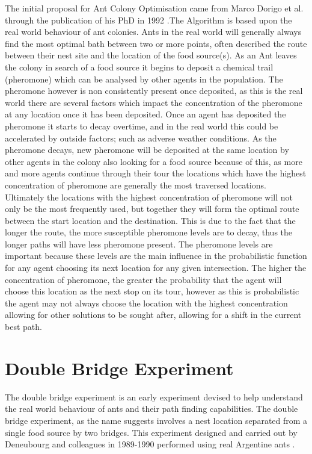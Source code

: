 The initial proposal for Ant Colony Optimisation came from Marco Dorigo et al. through the publication of his PhD in 1992 \cite{Dor1992:thesis}.The Algorithm is based upon the real world behaviour of ant colonies. Ants in the real world will generally always find the most optimal bath between two or more points, often described the route between their nest site and the location of the food source(s). As an Ant leaves the colony in search of a food source it begins to deposit a chemical trail (pheromone) which can be analysed by other agents in the population. The pheromone however is non consistently present once deposited, as this is the real world there are several factors which impact the concentration of the pheromone at any location once it has been deposited. Once an agent has deposited the pheromone it starts to decay overtime, and in the real world this could be accelerated by outside factors; such as adverse weather conditions. As the pheromone decays, new pheromone will be deposited at the same location by other agents in the colony also looking for a food source because of this, as more and more agents continue through their tour the locations which have the highest concentration of pheromone are generally the most traversed locations. Ultimately the locations with the highest concentration of pheromone will not only be the most frequently used, but together they will form the optimal route between the start location and the destination. This is due to the fact that the longer the route, the more susceptible pheromone levels are to decay, thus the longer paths will have less pheromone present. The pheromone levels are important because these levels are the main influence in the probabilistic function for any agent choosing its next location for any given intersection. The higher the concentration of pheromone, the greater the probability that the agent will choose this location as the next stop on its tour, however as this is probabilistic the agent may not always choose the location with the highest concentration allowing for other solutions to be sought after, allowing for a shift in the current best path.

\section{Double Bridge Experiment}

The double bridge experiment is an early experiment devised to help understand the real world behaviour of ants and their path finding capabilities. The double bridge experiment, as the name suggests involves a nest location separated from a single food source by two bridges. This experiment designed and carried out by Deneubourg and colleagues in 1989-1990 performed using real Argentine ants \cite{marcdorgio:book:doublebridges}.


